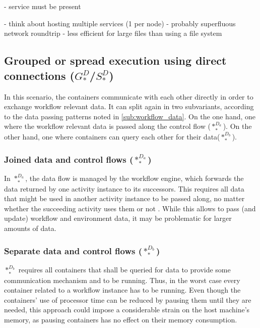   - service must be present

  - think about hosting multiple services (1 per node)
  - probably superfluous network roundtrip
  - less efficient for large files than using a file system


\subsection[Grouped or spread execution using direct connections]{Grouped or spread execution using direct connections ($G_{*}^{D}$/$S_{*}^{D}$)} %
\label{sub:grouped_execution_using_direct_connections}

  In this scenario, the containers communicate with each other directly in order to exchange workflow relevant data. It can split again in two subvariants, according to the data passing patterns noted in \ref{sub:workflow_data}. On the one hand, one where the workflow relevant data is passed along the control flow ($*_{*}^{D_a}$). On the other hand, one where containers can query each other for their data($*_{*}^{D_b}$).

  \subsubsection{Joined data and control flows ($*_{*}^{D_a}$)} %
    In $*_{*}^{D_a}$, the data flow is managed by the workflow engine, which forwards the data returned by one activity instance to its successors. This requires all data that might be used in another activity instance to be passed along, no matter whether the succeeding activity uses them or not \cite{Russell2005Workflow}. While this allows to pass (and update) workflow and environment data, it may be problematic for larger amounts of data.

  \subsubsection{Separate data and control flows ($*_{*}^{D_b}$)} %
    $*_{*}^{D_b}$ requires all containers that shall be queried for data to provide some communication mechanism and to be running. Thus, in the worst case every container related to a workflow instance has to be running. Even though the containers' use of processor time can be reduced by pausing them until they are needed, this approach could impose a considerable strain on the host machine's memory, as pausing containers has no effect on their memory consumption.

